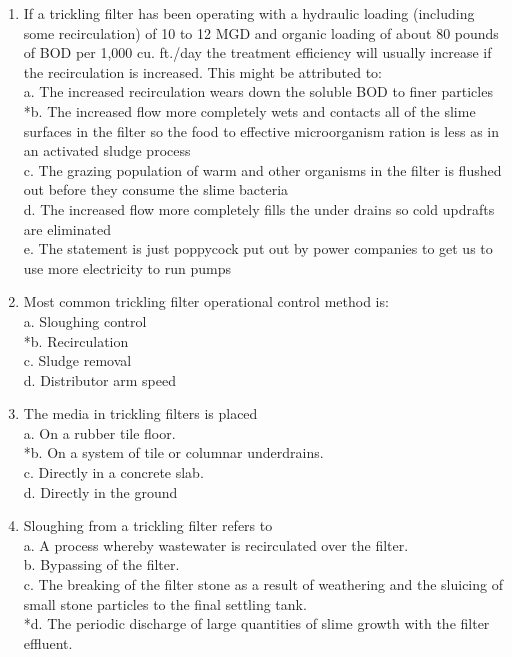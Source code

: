 \begin{enumerate}
\item  If a trickling filter has been operating with a hydraulic loading (including some recirculation) of 10 to 12 MGD and organic loading of about 80 pounds of BOD per 1,000 cu. ft./day the treatment efficiency will usually increase if the recirculation is increased. This might be attributed to: \\

 a. The increased recirculation wears down the soluble BOD to finer particles \\
 *b. The increased flow more completely wets and contacts all of the slime surfaces in the filter so the food to effective microorganism ration is less as in an activated sludge process \\
 c. The grazing population of warm and other organisms in the filter is flushed out before they consume the slime bacteria \\
 d. The increased flow more completely fills the under drains so cold updrafts are eliminated \\
 e. The statement is just poppycock put out by power companies to get us to use more electricity to run pumps \\


\item  Most common trickling filter operational control method is: \\

 a. Sloughing control \\
 *b. Recirculation \\
 c. Sludge removal \\
 d. Distributor arm speed \\


\item  The media in trickling filters is placed\\
 a. On a rubber tile floor. \\
 *b. On a system of tile or columnar underdrains. \\
 c. Directly in a concrete slab. \\
 d. Directly in the ground \\


\item  Sloughing from a trickling filter refers to \\

 a. A process whereby wastewater is recirculated over the filter. \\
 b. Bypassing of the filter. \\
 c. The breaking of the filter stone as a result of weathering and the sluicing of small stone particles to the final settling tank. \\
 *d. The periodic discharge of large quantities of slime growth with the filter effluent. \\



\end{enumerate}
